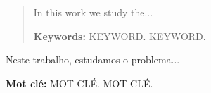 \begin{abstract}

In this work we study the...

\vspace{1\baselineskip}

\textbf{Keywords:} KEYWORD. KEYWORD.

\end{abstract}

\begin{summary}

    Neste trabalho, estudamos o problema...

    \vspace{1\baselineskip}

    \textbf{Mot clé:} MOT CLÉ. MOT CLÉ.

\end{summary}
